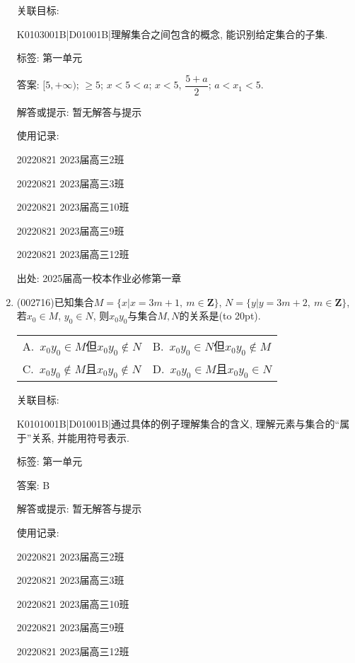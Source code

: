 \documentclass[10pt,a4paper]{article}
\newcommand{\bracket}[1]{(\hbox to #1pt{})}
\newcommand{\twoch}[4]{\par\begin{tabular}{p{.46\textwidth}p{.46\textwidth}}
A.~#1& B.~#2\\
C.~#3& D.~#4
\end{tabular}}
\begin{document}
\begin{enumerate}[1.]
关联目标:

K0103001B|D01001B|理解集合之间包含的概念, 能识别给定集合的子集.



标签: 第一单元

答案: $[5,+\infty)$; $\ge 5$; $x<5<a$; $x<5$, $\dfrac{5+a}2$; $a<x_1<5$.

解答或提示: 暂无解答与提示

使用记录:

20220821	2023届高三2班	

20220821	2023届高三3班	

20220821	2023届高三10班	

20220821	2023届高三9班	

20220821	2023届高三12班	


出处: 2025届高一校本作业必修第一章
\newpage
\item{ (002716)}已知集合$M=\{x|x=3m+1, \ m\in \mathbf{Z}\}$, $N=\{y|y=3m+2, \ m\in \mathbf{Z}\}$, 若$x_0\in M$, $y_0\in N$, 则$x_0y_0$与集合$M,N$的关系是\bracket{20}.
\twoch{$x_0y_0\in M$但$x_0y_0$$\notin N$}{$x_0y_0\in N$但$x_0y_0\notin M$}{$x_0y_0\notin M$且$x_0y_0\notin N$}{$x_0y_0$$\in M$且$x_0y_0\in N$}


关联目标:

K0101001B|D01001B|通过具体的例子理解集合的含义, 理解元素与集合的``属于''关系, 并能用符号表示.



标签: 第一单元

答案: B

解答或提示: 暂无解答与提示

使用记录:

20220821	2023届高三2班	

20220821	2023届高三3班	

20220821	2023届高三10班	

20220821	2023届高三9班	

20220821	2023届高三12班	



\end{enumerate}
\end{document}
